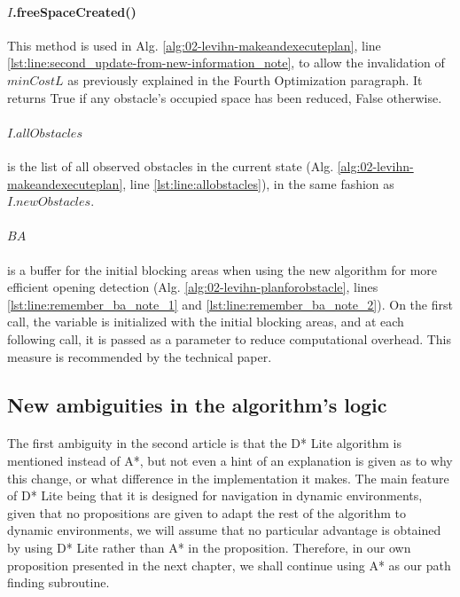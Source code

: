 \paragraph{$I$.freeSpaceCreated()} This method is used in Alg. \ref{alg:02-levihn-makeandexecuteplan}, line \ref{lst:line:second_update-from-new-information_note}, to allow the invalidation of $minCostL$ as previously explained in the Fourth Optimization paragraph. It returns True if any obstacle's occupied space has been reduced, False otherwise.

\paragraph{$I.allObstacles$} is the list of all observed obstacles in the current state (Alg. \ref{alg:02-levihn-makeandexecuteplan}, line \ref{lst:line:allobstacles}), in the same fashion as $I.newObstacles$.

\paragraph{$BA$} is a buffer for the initial blocking areas when using the new algorithm for more efficient opening detection (Alg. \ref{alg:02-levihn-planforobstacle}, lines \ref{lst:line:remember_ba_note_1} and \ref{lst:line:remember_ba_note_2}). On the first call, the variable is initialized with the initial blocking areas, and at each following call, it is passed as a parameter to reduce computational overhead. This measure is recommended by the technical paper.

\subsection{New ambiguities in the algorithm's logic}

\paragraph{} The first ambiguity in the second article \parencite{levihn_locally_2014} is that the D* Lite algorithm is mentioned instead of A*, but not even a hint of an explanation is given as to why this change, or what difference in the implementation it makes. The main feature of D* Lite being that it is designed for navigation in dynamic environments, given that no propositions are given to adapt the rest of the algorithm to dynamic environments, we will assume that no particular advantage is obtained by using D* Lite rather than A* in the proposition. Therefore, in our own proposition presented in the next chapter, we shall continue using A* as our path finding subroutine.

